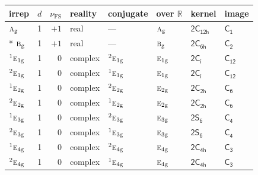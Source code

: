 \documentclass[10pt,a4paper]{article}
\numberwithin{equation}{section}
\newcommand{\grp}[1]{\mathsf{#1}}
\newcommand{\irr}[1]{\text{\normalfont\scshape #1}}
\newcommand{\conjpair}[1]{{}^{#1}}
\newcommand{\ptag}[1]{\mathrm{#1}}
\newcommand{\fsind}{\nu_{\mathrm{FS}}}
\begin{document}
{\small\renewcommand{\arraystretch}{1.25}\setlength{\tabcolsep}{4pt}\begin{longtable}{@{}lrrlllll@{}}\toprule
irrep & $d$ & $\fsind$ & reality & conjugate & over $\mathbb{R}$ & kernel & image\\\midrule\endhead
\bottomrule\endfoot\endlastfoot
$\irr{a}_{\ptag{g}}$ & 1 & $+1$ & real & --- & $\irr{a}_{\ptag{g}}$ & \href{2C12h.pdf}{$\grp{2C_{12h}}$} & \href{../../../rotation/data/pdf/C1.pdf}{$\grp{C_{1}}$}\\*
$\irr{b}_{\ptag{g}}$ & 1 & $+1$ & real & --- & $\irr{b}_{\ptag{g}}$ & \href{2C6h.pdf}{$\grp{2C_{6h}}$} & \href{../../../rotation/data/pdf/C2.pdf}{$\grp{C_{2}}$}\\
$\conjpair{1}\irr{e}_{1\ptag{g}}$ & 1 & $0$ & complex & $\conjpair{2}\irr{e}_{1\ptag{g}}$ & $\irr{e}_{1\ptag{g}}$ & \href{2S2.pdf}{$\grp{2C_{i}}$} & \href{../../../rotation/data/pdf/C12.pdf}{$\grp{C_{12}}$}\\
$\conjpair{2}\irr{e}_{1\ptag{g}}$ & 1 & $0$ & complex & $\conjpair{1}\irr{e}_{1\ptag{g}}$ & $\irr{e}_{1\ptag{g}}$ & \href{2S2.pdf}{$\grp{2C_{i}}$} & \href{../../../rotation/data/pdf/C12.pdf}{$\grp{C_{12}}$}\\
$\conjpair{1}\irr{e}_{2\ptag{g}}$ & 1 & $0$ & complex & $\conjpair{2}\irr{e}_{2\ptag{g}}$ & $\irr{e}_{2\ptag{g}}$ & \href{2C2h.pdf}{$\grp{2C_{2h}}$} & \href{../../../rotation/data/pdf/C6.pdf}{$\grp{C_{6}}$}\\
$\conjpair{2}\irr{e}_{2\ptag{g}}$ & 1 & $0$ & complex & $\conjpair{1}\irr{e}_{2\ptag{g}}$ & $\irr{e}_{2\ptag{g}}$ & \href{2C2h.pdf}{$\grp{2C_{2h}}$} & \href{../../../rotation/data/pdf/C6.pdf}{$\grp{C_{6}}$}\\
$\conjpair{1}\irr{e}_{3\ptag{g}}$ & 1 & $0$ & complex & $\conjpair{2}\irr{e}_{3\ptag{g}}$ & $\irr{e}_{3\ptag{g}}$ & \href{2S6.pdf}{$\grp{2S_{6}}$} & \href{../../../rotation/data/pdf/C4.pdf}{$\grp{C_{4}}$}\\
$\conjpair{2}\irr{e}_{3\ptag{g}}$ & 1 & $0$ & complex & $\conjpair{1}\irr{e}_{3\ptag{g}}$ & $\irr{e}_{3\ptag{g}}$ & \href{2S6.pdf}{$\grp{2S_{6}}$} & \href{../../../rotation/data/pdf/C4.pdf}{$\grp{C_{4}}$}\\
$\conjpair{1}\irr{e}_{4\ptag{g}}$ & 1 & $0$ & complex & $\conjpair{2}\irr{e}_{4\ptag{g}}$ & $\irr{e}_{4\ptag{g}}$ & \href{2C4h.pdf}{$\grp{2C_{4h}}$} & \href{../../../rotation/data/pdf/C3.pdf}{$\grp{C_{3}}$}\\
$\conjpair{2}\irr{e}_{4\ptag{g}}$ & 1 & $0$ & complex & $\conjpair{1}\irr{e}_{4\ptag{g}}$ & $\irr{e}_{4\ptag{g}}$ & \href{2C4h.pdf}{$\grp{2C_{4h}}$} & \href{../../../rotation/data/pdf/C3.pdf}{$\grp{C_{3}}$}\\

\end{longtable}}
\end{document}
